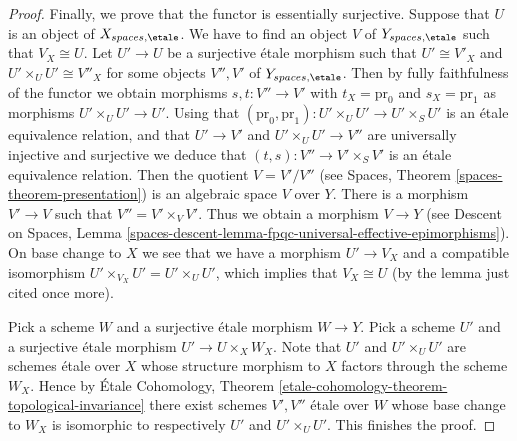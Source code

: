 \begin{proof}
\medskip\noindent
Finally, we prove that the functor is essentially surjective.
Suppose that $U$ is an object of $X_{spaces, \etale}$.
We have to find an object $V$ of $Y_{spaces, \etale}$
such that $V_X \cong U$. Let $U' \to U$ be a surjective \'etale morphism
such that $U' \cong V'_X$ and $U' \times_U U' \cong V''_X$
for some objects $V'', V'$ of $Y_{spaces, \etale}$.
Then by fully faithfulness of the functor we obtain morphisms
$s, t : V'' \to V'$ with $t_X = \text{pr}_0$ and $s_X = \text{pr}_1$
as morphisms $U' \times_U U' \to U'$. Using that
$(\text{pr}_0, \text{pr}_1) : U' \times_U U' \to U' \times_S U'$
is an \'etale equivalence relation, and that $U' \to V'$ and
$U' \times_U U' \to V''$ are universally injective and surjective
we deduce that
$(t, s) : V'' \to V' \times_S V'$ is an \'etale equivalence relation.
Then the quotient $V = V'/V''$ (see
Spaces, Theorem \ref{spaces-theorem-presentation})
is an algebraic space $V$ over $Y$. There is a morphism
$V' \to V$ such that $V'' = V' \times_V V'$. Thus we obtain a morphism
$V \to Y$ (see
Descent on Spaces, Lemma
\ref{spaces-descent-lemma-fpqc-universal-effective-epimorphisms}).
On base change to $X$ we see that we have a morphism $U' \to V_X$
and a compatible isomorphism $U' \times_{V_X} U' = U' \times_U U'$, which
implies that $V_X \cong U$ (by the lemma just cited once more).

\medskip\noindent
Pick a scheme $W$ and a surjective \'etale morphism $W \to Y$.
Pick a scheme $U'$ and a surjective \'etale morphism $U' \to U \times_X W_X$.
Note that $U'$ and $U' \times_U U'$ are schemes \'etale over $X$ whose
structure morphism to $X$ factors through the scheme $W_X$.
Hence by
\'Etale Cohomology,
Theorem \ref{etale-cohomology-theorem-topological-invariance}
there exist schemes $V', V''$ \'etale over $W$ whose base change to
$W_X$ is isomorphic to respectively $U'$ and $U' \times_U U'$.
This finishes the proof.
\end{proof}
